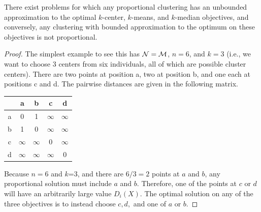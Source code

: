 \begin{example} 
\label{example:impossibility}
There exist problems for which any proportional clustering has an unbounded approximation to the optimal $k$-center, $k$-means, and $k$-median objectives, and conversely, any clustering with bounded approximation to the optimum on these objectives is not proportional.  
\end{example}
\begin{proof}
The simplest example to see this has $\mathcal {N} = \mathcal{M}$, $n=6$, and $k=3$ (i.e., we want to choose 3 centers from six individuals, all of which are possible cluster centers). There are two points at position a, two at position b, and one each at positions c and d. The pairwise distances are given in the following matrix.
\begin{center}
  \begin{tabular}{| c || c | c | c | c |} 
  \hline
	& a & b & c & d \\ \hline \hline
	a & 0 & 1 & $\infty$ & $\infty$ \\ \hline
	b & 1 & 0 & $\infty$ & $\infty$ \\ \hline
	c & $\infty$ & $\infty$ & 0 & $\infty$ \\ \hline
	d & $\infty$ & $\infty$ & $\infty$ & 0 \\ \hline
\end{tabular}
\end{center}
Because $n=6$ and $k$=3, and there are $6/3 = 2$ points at $a$ and $b$, any proportional solution must include $a$ and $b$. Therefore, one of the points at $c$ or $d$ will have an arbitrarily large value $D_i(X)$. The optimal solution on any of the three objectives is to instead choose $c,d,$ and one of $a$ or $b$.
\end{proof}



